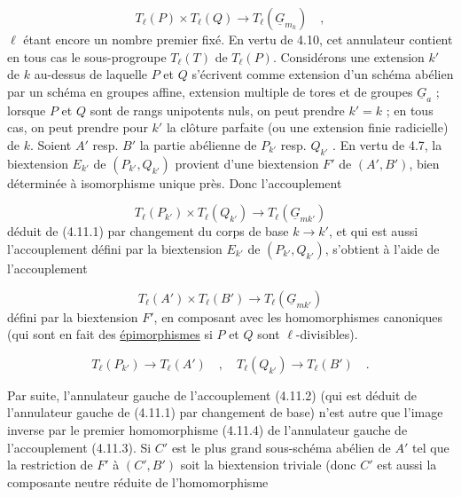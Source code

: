\begin{equation}\tag{4.11.1}
T_\ell(P) \times T_\ell(Q) \longrightarrow T_\ell(\underline{G}_{m_k}) \quad ,
\end{equation}
$\ell$ étant encore un nombre premier fixé.  En vertu de 4.10, cet annulateur contient en tous cas le sous-progroupe $T_\ell(T)$ de $T_\ell(P)$. Considérons une extension $k'$ de $k$ au-dessus de laquelle $P$ et $Q$ s'écrivent comme extension d'un schéma abélien par un schéma en groupes affine, extension multiple de tores et de groupes $\underline{G}_a$ ; lorsque $P$ et $Q$ sont de rangs unipotents nuls, on peut prendre $k'=k$ ; en tous cas, on peut prendre pour $k'$ la clôture parfaite (ou une extension finie radicielle) de $k$. Soient $A'$ resp. $B'$ la partie abélienne de $P_{k'}$ resp. $Q_{k'}$ . En vertu de 4.7, la biextension $E_{k'}$ de $(P_{k'},Q_{k'})$ provient d'une biextension $F'$ de $(A',B')$, bien déterminée à isomorphisme unique près. Donc l'accouplement

\begin{equation}\tag{4.11.2}
T_\ell(P_{k'}) \times T_\ell(Q_{k'}) \longrightarrow T_\ell(\underline{G}_{mk'})
\end{equation}
déduit de (4.11.1) par changement du corps de base $k \longrightarrow k'$, et qui est aussi l'accouplement défini par la biextension $E_{k'}$ de $(P_{k'},Q_{k'})$, s'obtient à l'aide de l'accouplement

\begin{equation}\tag{4.11.3}
T_\ell(A') \times T_\ell(B') \longrightarrow T_\ell(\underline{G}_{mk'})
\end{equation}
défini par la biextension $F'$, en composant avec les homomorphismes canoniques (qui sont en fait des \underline{épimorphismes} si $P$ et $Q$ sont $\ell$-divisibles).

\begin{equation}\tag{4.11.4}
T_\ell(P_{k'}) \longrightarrow T_\ell(A') \quad , \quad T_\ell(Q_{k'}) \longrightarrow T_\ell(B') \quad .
\end{equation}


Par suite, l'annulateur gauche de l'accouplement (4.11.2) (qui est déduit de l'annulateur gauche de (4.11.1) par changement de base) n'est autre que l'image inverse par le premier homomorphisme (4.11.4) de l'annulateur gauche de l'accouplement (4.11.3). Si $C'$ est le plus grand sous-schéma abélien de $A'$ tel que la restriction de $F'$ à $(C',B')$ soit la biextension triviale (donc $C'$ est aussi la composante neutre réduite de l'homomorphisme

